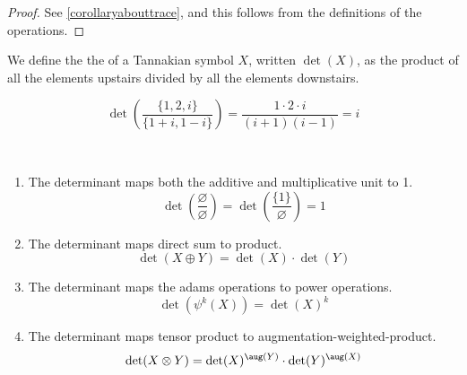 \documentclass[a4paper]{article}
\begin{document}
\begin{proof}
See \ref{corollaryabouttrace}, and this follows from the definitions of the operations.
\end{proof}

\begin{definition}
We define the the  of a Tannakian symbol $X$, written $\det(X)$, as the product of all the elements upstairs divided by all the elements downstairs.
\end{definition}

\begin{example}
$$\det\left(\frac{\{1, 2, i\}}{\{1 + i, 1 - i\}}\right) = \frac{1 \cdot 2 \cdot i}{(i + 1)(i - 1)} = i$$
\end{example}

\begin{proposition}
\ \\ \begin{enumerate}
\item The determinant maps both the additive and multiplicative unit to 1.
$$\det\left(\frac{\varnothing}{\varnothing}\right) = \det\left(\frac{\{1\}}{\varnothing}\right) = 1$$
\item The determinant maps direct sum to product.
$$\det(X \oplus Y) = \det(X) \cdot \det(Y)$$
\item The determinant maps the adams operations to power operations.
$$\det(\psi^k(X)) = \det(X)^k$$
\item The determinant maps tensor product to augmentation-weighted-product.
$$\det(X \otimes Y) = \det(X)^{\aug(Y)} \cdot \det(Y)^{\aug(X)}$$
\end{enumerate}
\end{proposition}
\end{document}
